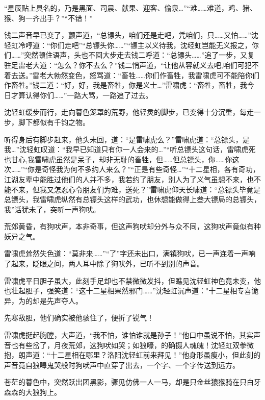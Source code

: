 \documentclass[12pt,oneside]{book}
\begin{document}
``星辰贴上具名的，乃是黑面、司晨、献果、迎客、偷泉\ldots{}''``难\ldots\ldots 难道，鸡、猪、猴、狗一齐出手？''``不错！''

钱二声音早已变了，颤声道，``总镖头，咱们还是走吧，凭咱们，只\ldots\ldots 又怕\ldots\ldots{}''沈轻虹冷哼道：``你们走吧''``总镖头你\ldots\ldots{}''``镖主以义待我，沈经虹岂能无义报之，你们\ldots\ldots{}''突然顿住语声，头也不回大步走去钱二呼道：``总镖头\ldots\ldots{}''追了一步，又复驻足雷老大道：``怎么？你不去么？''钱二悄声道，``让他从容就义去吧,咱们可犯不着去送。''雷老大勃然变色，怒骂道：``畜牲\ldots\ldots 你们作畜牲，我雷啸虎可不能陪你们作畜牲。''钱二道：``好，好，我是畜牲，你是义士\ldots{}''雷啸虎：``畜牲，畜牲，我今日才算认得你们\ldots\ldots{}''一路大骂，一路追了过去。

沈轻虹缓步而行，走向暮色笼罩的荒野，他轻灵的脚步，已变得十分沉重，每走一步，脚下都似有千钧之物。

听得身后有脚步赶来，他头未回，道：``是雷啸虎么？''雷啸虎道：``总镖头，是我\ldots{}''沈轻虹叹道：``我早已知道只有你一人会来的\ldots{}''``听总镖头这句话，雷啸虎死也甘心,我雷啸虎虽然是呆子，却非无耻的畜牲，但\ldots\ldots 但总镖头，你\ldots\ldots 你这次\ldots\ldots{}''``你是奇怪我为何不多约人来么？''``正是有些奇怪\ldots{}''``十二星相，各有奇功，江湖友辈中能胜过他们的人并不多，我若约了朋友，别人为了义气虽想不来，也不能不来，但我又怎忍心令朋友们为难，送死？''雷啸虎仰天长啸道：``总镖头毕竟是总镖头，我雷啸虎纵然有总镖头这样的武功，也休想能做得上叁大镖局的总镖头，我''话犹未了，突听一声狗吠。

荒郊黄昏，有狗吠声，本非奇事，但这声狗吠却分外与众不同，这狗吠声竟似有种妖异之气。

雷啸虎耸然失色道：``莫非来\ldots\ldots{}''``了''字还未出口，满镇狗吠，已一声连着一声响了起来，眨眼之间，两人耳中除了狗吠外，已听不到别的声音。

雷啸虎平日胆子虽大，此刻手足却也不禁微微发抖，但瞧见沈轻虹神色竟未变，他也壮起胆子，强笑道：``这十二星相果然邪门\ldots\ldots{}''沈轻虹沉声道："十二星相专喜诡异，为的却是先声夺人。

先寒敌胆，他们确实被他骇住了，便折了锐气！

雷啸虎挺起胸膛，大声道，``我不怕，谁怕谁就是孙子！''他口中虽说不怕，其实声音也有些岔了，月夜荒郊，这狗吠如哭；如狼嚎，的确摄人魂魄！沈轻虹双拳微抱，朗声道：``十二星相在哪里？洛阳沈轻虹前来拜见！''他身形虽瘦小，但此刻的声音竟自狼嗥鬼哭般时狗吠声中直穿了出去，一个字、一个字传送到远方。

苍茫的暮色中，突然跃出团黑影，骤见仿佛一人一马，却是只金丝猿猴骑在只白牙森森的大狼狗上。
\end{document}
